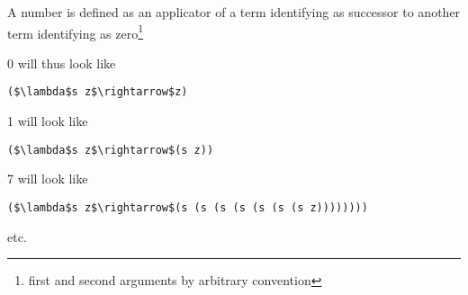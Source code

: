 \documentclass{beamer}
\begin{document}
\begin{frame}[fragile]{\CurrentSection}
\begin{block}{\CurrentSubSection}
A number is defined as an applicator of a term identifying as successor to another term identifying as zero\footnote{first and second arguments by arbitrary convention}
\end{block}


\end{frame}

\begin{frame}[fragile]{\CurrentSection}
\begin{exampleblock}{}
0 will thus look like
\end{exampleblock}

 
\lstset{basicstyle=\ttfamily\small}\lstset{numbers=none}\lstset{language=ML}\begin{lstlisting}
($\lambda$s z$\rightarrow$z)
\end{lstlisting}
 
\begin{exampleblock}{}
1 will look like
\end{exampleblock}

 
\lstset{basicstyle=\ttfamily\small}\lstset{numbers=none}\lstset{language=ML}\begin{lstlisting}
($\lambda$s z$\rightarrow$(s z))
\end{lstlisting}
 
\begin{exampleblock}{}
7 will look like
\end{exampleblock}

 
\lstset{basicstyle=\ttfamily\small}\lstset{numbers=none}\lstset{language=ML}\begin{lstlisting}
($\lambda$s z$\rightarrow$(s (s (s (s (s (s (s z))))))))
\end{lstlisting}
 
\begin{exampleblock}{}
etc.
\end{exampleblock}

 

\end{frame}
\end{document}
